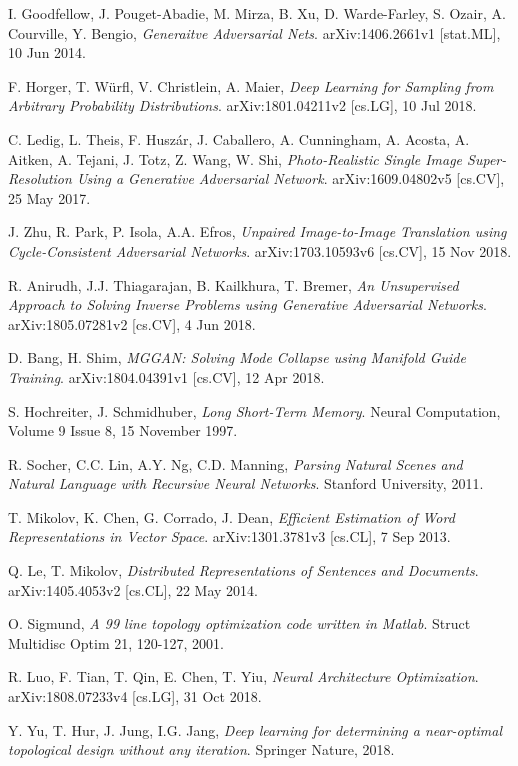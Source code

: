 \documentclass[a4paper]{article}
\begin{document}
\begin{thebibliography}{999}
  I. Goodfellow, J. Pouget-Abadie, M. Mirza, B. Xu, D. Warde-Farley, S. Ozair, A. Courville, Y. Bengio,
  \emph{Generaitve Adversarial Nets}.
  arXiv:1406.2661v1 [stat.ML],
  10 Jun 2014.

  F. Horger, T. W\"urfl, V. Christlein, A. Maier,
  \emph{Deep Learning for Sampling from Arbitrary Probability Distributions}.
  arXiv:1801.04211v2 [cs.LG],
  10 Jul 2018.

  C. Ledig, L. Theis, F. Husz\'ar, J. Caballero, A. Cunningham, A. Acosta, A. Aitken, A. Tejani, J. Totz, Z. Wang, W. Shi,
  \emph{Photo-Realistic Single Image Super-Resolution Using a Generative Adversarial Network}.
  arXiv:1609.04802v5 [cs.CV],
  25 May 2017.

  J. Zhu, R. Park, P. Isola, A.A. Efros,
  \emph{Unpaired Image-to-Image Translation using Cycle-Consistent Adversarial Networks}.
  arXiv:1703.10593v6 [cs.CV],
  15 Nov 2018.

  R. Anirudh, J.J. Thiagarajan, B. Kailkhura, T. Bremer,
  \emph{An Unsupervised Approach to Solving Inverse Problems using Generative Adversarial Networks}.
  arXiv:1805.07281v2 [cs.CV],
  4 Jun 2018.

  D. Bang, H. Shim,
  \emph{MGGAN: Solving Mode Collapse using Manifold Guide Training}.
  arXiv:1804.04391v1 [cs.CV],
  12 Apr 2018.

  S. Hochreiter, J. Schmidhuber,
  \emph{Long Short-Term Memory}.
  Neural Computation,
  Volume 9 Issue 8,
  15 November 1997.

  R. Socher, C.C. Lin, A.Y. Ng, C.D. Manning,
  \emph{Parsing Natural Scenes and Natural Language with Recursive Neural Networks}.
  Stanford University,
  2011.

  T. Mikolov, K. Chen, G. Corrado, J. Dean,
  \emph{Efficient Estimation of Word Representations in Vector Space}.
  arXiv:1301.3781v3 [cs.CL],
  7 Sep 2013.

  Q. Le, T. Mikolov,
  \emph{Distributed Representations of Sentences and Documents}.
  arXiv:1405.4053v2 [cs.CL],
  22 May 2014.


  O. Sigmund,
  \emph{A 99 line topology optimization code written in Matlab}.
  Struct Multidisc Optim 21,
  120-127,
  2001.

  R. Luo, F. Tian, T. Qin, E. Chen, T. Yiu,
  \emph{Neural Architecture Optimization}.
  arXiv:1808.07233v4 [cs.LG],
  31 Oct 2018.

  Y. Yu, T. Hur, J. Jung, I.G. Jang,
  \emph{Deep learning for determining a near-optimal topological design without any iteration}.
  Springer Nature,
  2018.

\end{thebibliography}
\end{document}
